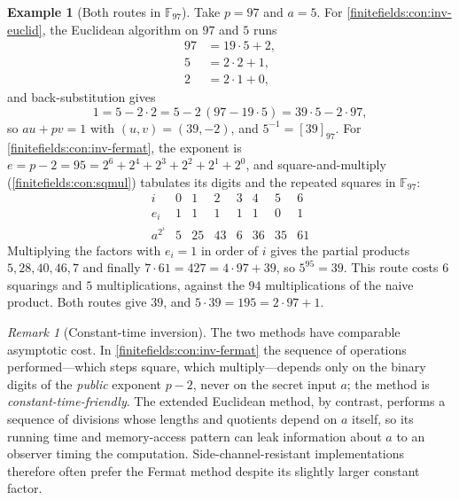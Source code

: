 \documentclass[11pt,a4paper]{article}
\theoremstyle{definition}
\newtheorem{example}[theorem]{Example}
\theoremstyle{remark}
\newtheorem{remark}[theorem]{Remark}
\newcommand{\F}{\ensuremath{\mathbb{F}}}
\begin{document}
\begin{example}[Both routes in \(\F_{97}\)]\label{finitefields:ex:inv97}
Take \(p = 97\) and \(a = 5\). For \cref{finitefields:con:inv-euclid}, the
Euclidean algorithm on \(97\) and \(5\) runs
\[
\begin{aligned}
97 &= 19\cdot 5 + 2, \\
5 &= 2\cdot 2 + 1, \\
2 &= 2\cdot 1 + 0,
\end{aligned}
\]
and back-substitution gives
\[
1 = 5 - 2\cdot 2 = 5 - 2\,(97 - 19\cdot 5) = 39\cdot 5 - 2\cdot 97 ,
\]
so \(au + pv = 1\) with \((u, v) = (39, -2)\), and
\(5^{-1} = [39]_{97}\). For \cref{finitefields:con:inv-fermat}, the
exponent is \(e = p - 2 = 95 = 2^6 + 2^4 + 2^3 + 2^2 + 2^1 + 2^0\), and
square-and-multiply (\cref{finitefields:con:sqmul}) tabulates its digits
and the repeated squares in \(\F_{97}\):
\[
\begin{array}{c|ccccccc}
i & 0 & 1 & 2 & 3 & 4 & 5 & 6 \\\hline
e_i & 1 & 1 & 1 & 1 & 1 & 0 & 1 \\
a^{2^i} & 5 & 25 & 43 & 6 & 36 & 35 & 61
\end{array}
\]
Multiplying the factors with \(e_i = 1\) in order of \(i\) gives the
partial products \(5, 28, 40, 46, 7\) and finally
\(7 \cdot 61 = 427 = 4 \cdot 97 + 39\), so \(5^{95} = 39\). This route
costs \(6\) squarings and \(5\) multiplications, against the \(94\)
multiplications of the naive product. Both routes give \(39\), and
\(5 \cdot 39 = 195 = 2 \cdot 97 + 1\).
\end{example}

\begin{remark}[Constant-time inversion]\label{finitefields:rem:cttime}
The two methods have comparable asymptotic cost. In
\cref{finitefields:con:inv-fermat} the sequence of operations
performed---which steps square, which multiply---depends only on the binary
digits of the \emph{public} exponent \(p - 2\), never on the secret input
\(a\); the method is \emph{constant-time-friendly}. The extended Euclidean
method, by contrast, performs a sequence of divisions whose lengths and
quotients depend on \(a\) itself, so its running time and memory-access
pattern can leak information about \(a\) to an observer timing the
computation. Side-channel-resistant implementations therefore often prefer
the Fermat method despite its slightly larger constant factor.
\end{remark}
\end{document}
